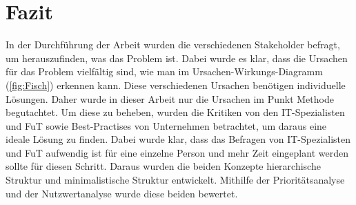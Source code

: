 \chapter{Fazit}
\label{ch:chapter06}
In der Durchführung der Arbeit wurden die verschiedenen Stakeholder befragt, um herauszufinden, was das Problem ist.
Dabei wurde es klar, dass die Ursachen für das Problem vielfältig sind, wie man im Ursachen-Wirkungs-Diagramm (\ref{fig:Fisch}) erkennen kann.
Diese verschiedenen Ursachen benötigen individuelle Lösungen.
Daher wurde in dieser Arbeit nur die Ursachen im Punkt Methode begutachtet.
Um diese zu beheben, wurden die Kritiken von den IT-Spezialisten und \ac{FuT} sowie Best-Practises von Unternehmen betrachtet, um daraus eine ideale Lösung zu finden.
Dabei wurde klar, dass das Befragen von IT-Spezialisten und \ac{FuT} aufwendig ist für eine einzelne Person und mehr Zeit eingeplant werden sollte für diesen Schritt.
Daraus wurden die beiden Konzepte hierarchische Struktur und minimalistische Struktur entwickelt.
Mithilfe der Prioritätsanalyse und der Nutzwertanalyse wurde diese beiden bewertet.

